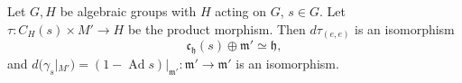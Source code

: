 Let $G, H$ be algebraic groups with $H$ acting on $G$, $s \in G$. Let $\tau: C_H(s) \times M' \rightarrow H$ be the product morphism. Then $d\tau_{(e,e)}$ is an isomorphism
$$\mathfrak{c}_\mathfrak{h}(s) \oplus \mathfrak{m}' \simeq \mathfrak{h},$$
and $d(\gamma_s|_{M'}) = (1 - \operatorname{Ad} s)|_{\mathfrak{m}'}: \mathfrak{m}' \rightarrow \mathfrak{m}'$ is an isomorphism.
